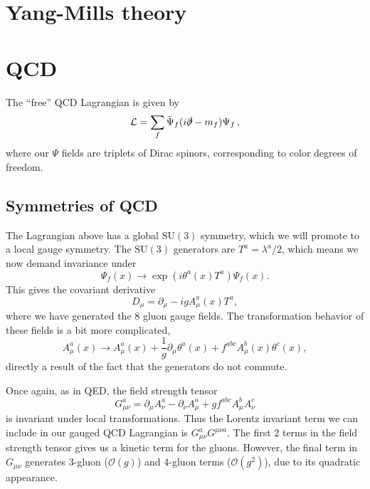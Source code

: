 \documentclass[12pt]{memoir}
\begin{document}
\section{Yang-Mills theory}

\section{QCD}

The ``free'' QCD Lagrangian is given by
\begin{equation}\label{eq:qcd_free}
  \mathcal{L} = \sum_{f} \bar{\Psi}_f (i \slashed{\partial} - m_f) \Psi_f\,,
\end{equation}
where our $\Psi$ fields are triplets of Dirac spinors, corresponding to color degrees of freedom.

\subsection{Symmetries of QCD}

The Lagrangian above has a global $\text{SU}(3)$ symmetry,
which we will promote to a local gauge symmetry.
The $\text{SU}(3)$ generators are $T^a=\lambda^a / 2$, which means we now demand invariance under
\begin{equation}
  \Psi_f(x) \rightarrow \exp(i\theta^a(x)T^a)\Psi_f(x).
\end{equation}
This gives the covariant derivative
\begin{equation}
  D_{\mu} = \partial_{\mu} - i g A_{\mu}^a(x) T^a,
\end{equation}
where we have generated the 8 gluon gauge fields.
The transformation behavior of these fields is a bit more complicated,
\begin{equation}
  A_{\mu}^a(x) \rightarrow A_{\mu}^a(x) + \frac{1}{g} \partial_{\mu} \theta^a(x) + f^{abc}A_{\mu}^b(x)\theta^c(x),
\end{equation}
directly a result of the fact that the generators do not commute.

Once again, as in QED, the field strength tensor
\begin{equation}
  G_{\mu\nu}^a = \partial_{\mu} A_{\nu}^a - \partial_{\nu} A_{\mu}^a  + g f^{abc} A_{\mu}^b A_{\nu}^c
\end{equation}
is invariant under local transformations.
Thus the Lorentz invariant term we can include in our gauged QCD Lagrangian is $G_{\mu\nu}^a G^{\mu\nu a}$.
The first 2 terms in the field strength tensor gives us a kinetic term for the gluons.
However, the final term in $G_{\mu\nu}$ generates 3-gluon ($\mathcal{O}(g)$) and 4-gluon terms ($\mathcal{O}(g^2)$), due to its quadratic appearance.
\end{document}
